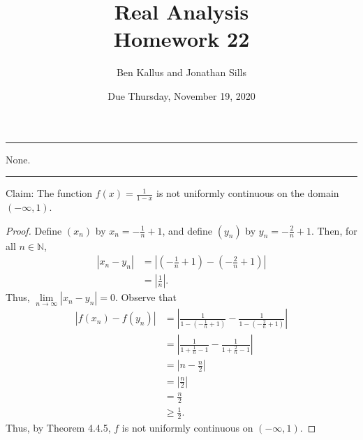 \documentclass[12pt]{article}
\title{Real Analysis \\ Homework 22}
\author{Ben Kallus and Jonathan Sills}
\date{Due Thursday, November 19, 2020}
\begin{document}
\pagecolor{black}
\color{white}
\maketitle

\hrule
\bigskip

 None.

\bigskip
\hrule
\bigskip


\medskip
{} Claim: The function $f(x) = \frac1{1-x}$ is not uniformly continuous on the domain $(-\infty, 1)$.
\begin{proof}
    Define $(x_n)$ by $x_n = -\frac1{n} + 1$, and define $(y_n)$ by $y_n = -\frac2{n} + 1$. Then, for all $n \in \mathbb N$,
    \begin{align*}
        |x_n - y_n| &= \left|\left(-\frac1{n} + 1\right) - \left(-\frac2{n} + 1\right)\right| \\
                    &= \left|\frac1n\right|.
    \end{align*}
    Thus, $\lim\limits_{n \to \infty} |x_n - y_n| = 0$. Observe that
    \begin{align*}
        |f(x_n) - f(y_n)| &= \left| \frac1{1-\left(-\frac1{n} + 1\right)} - \frac1{1-\left(-\frac2{n} + 1\right)} \right| \\
                          &= \left| \frac1{1 + \frac1{n} - 1} - \frac1{1 + \frac2{n} - 1} \right| \\
                          &= \left| n - \frac n2 \right| \\
                          &= \left| \frac n2 \right| \\
                          &= \frac n2 \\
                          &\geq \frac12.
    \end{align*}
    Thus, by Theorem 4.4.5, $f$ is not uniformly continuous on $(-\infty, 1)$.
\end{proof}
\end{document}
